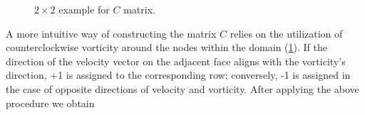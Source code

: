\documentclass{article}
\numberwithin{equation}{section}
\begin{document}
\begin{figure}[H] %
  \caption{$2\times 2$ example for $C$ matrix.}\label{fig:C-example-2x2}
\end{figure}
A more intuitive way of constructing the matrix $C$ relies on the utilization of counterclockwise vorticity around the nodes within the domain (\cref{fig:C-example-2x2}). If the direction of the velocity vector on the adjacent face aligns with the vorticity's direction, +1 is assigned to the corresponding row; conversely, -1 is assigned in the case of opposite directions of velocity and vorticity. After applying the above procedure we obtain
\end{document}
